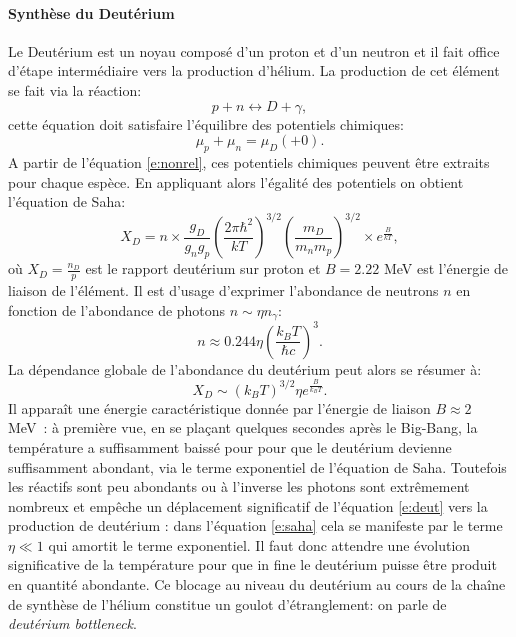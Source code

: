 \paragraph{Synthèse du Deutérium}
Le Deutérium est un noyau composé d'un proton et d'un neutron et il fait office d'étape intermédiaire vers la production d'hélium. La production de cet élément se fait via la réaction:
\begin{equation}
p+n\leftrightarrow D+\gamma ,
\label{e:deut}
\end{equation}
cette équation doit satisfaire l'équilibre des potentiels chimiques:
\begin{equation}
\mu_p +\mu_n =\mu_D (+0).
\end{equation}
A partir de l'équation \ref{e:nonrel}, ces potentiels chimiques peuvent être extraits pour chaque espèce. En appliquant alors l'égalité des potentiels on obtient l'équation de Saha:
\begin{equation}
X_D=n \times \frac{g_D}{g_n g_p} \left(\frac{2\pi \hbar^2}{kT}\right)^{3/2}\left(\frac{m_D}{m_n m_p}\right)^{3/2} \times e^{\frac{B}{kT}},
\end{equation}
où $X_D=\frac{n_D}{p}$ est le rapport deutérium sur proton et $B=2.22$ MeV est l'énergie de liaison de l'élément. Il est d'usage d'exprimer l'abondance de neutrons $n$ en fonction de l'abondance de photons $n\sim \eta n_\gamma$:
\begin{equation}
n\approx 0.244 \eta \left(\frac{k_BT}{\hbar c}\right)^3.
\end{equation}
La dépendance globale de l'abondance du deutérium peut alors se résumer à:
\begin{equation}
X_D\sim(k_BT)^{3/2}\eta e^{\frac{B}{k_B T}}.
\label{e:saha}
\end{equation}
Il apparaît une énergie caractéristique donnée par l'énergie de liaison $B\approx 2$ MeV~: à première vue, en se plaçant quelques secondes après le Big-Bang, la température a suffisamment baissé pour pour que le deutérium devienne suffisamment abondant, via le terme exponentiel de l'équation de Saha. Toutefois les réactifs sont peu abondants ou à l'inverse les photons sont extrêmement nombreux et empêche un déplacement significatif de l'équation \ref{e:deut} vers la production de deutérium : dans l'équation \ref{e:saha} cela se manifeste par le terme $\eta \ll 1$ qui amortit le terme exponentiel. Il faut donc attendre une évolution significative de la température pour que in fine le deutérium puisse être produit en quantité abondante. Ce blocage au niveau du deutérium au cours de la chaîne de synthèse de l'hélium constitue un goulot d'étranglement: on parle de \textit{deutérium bottleneck}.

